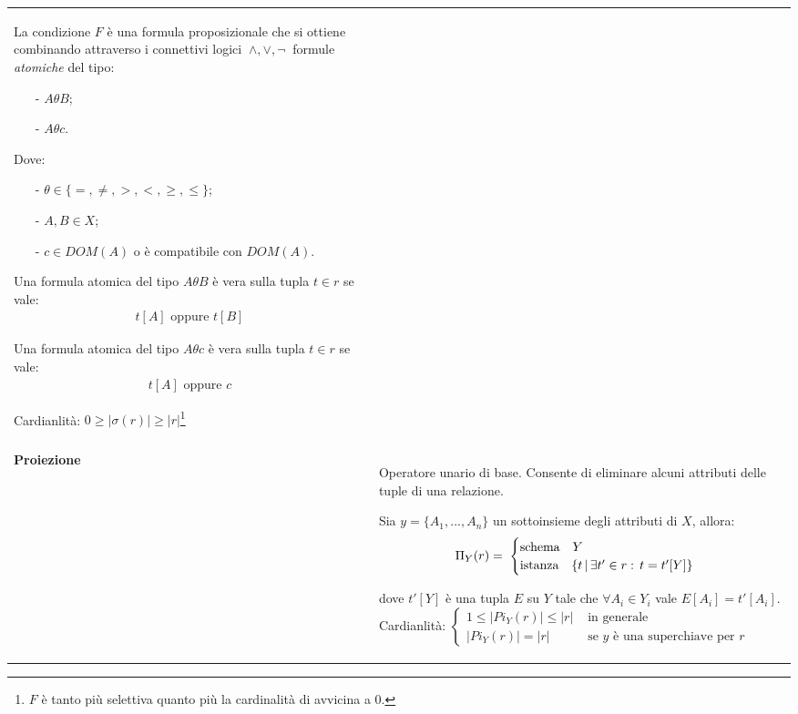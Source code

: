 \documentclass[a4paper, 10pt]{report}
\begin{document}
\begin{longtable}{| p{} | p{} |}
La condizione $F$ è una formula proposizionale che si ottiene combinando attraverso i connettivi logici $\: \wedge, \vee, \neg \:$ formule \emph{atomiche} del tipo:

			\begin{itemize}
				\item[-] $A \theta B$;
				\item[-] $A \theta c$.
			\end{itemize}		
			Dove:
			
			\begin{itemize}
				\item[-] $\theta \in \{ =, \neq, >, <,  \geq, \leq \}$;
				\item[-] $A, B \in X$;
				\item[-] $c \in DOM(A)$ o è compatibile con $DOM(A)$.
			\end{itemize}
			
Una formula atomica del tipo $A\theta B$ è vera sulla tupla $t \in r$ se vale:
\begin{align*}
t[A] \text{ oppure } t[B]
\end{align*}

Una formula atomica del tipo $A\theta c$ è vera sulla tupla $t \in r$ se vale:
\begin{align*}
t[A] \text{ oppure } c
\end{align*}

Cardianlità: $0 \ge |\sigma(r)| \ge |r|$\footnote{$F$ è tanto più selettiva quanto più la cardinalità di avvicina a 0.}
\\\\
\textbf{Proiezione} & Operatore unario di base. Consente di eliminare alcuni attributi delle tuple di una relazione.

Sia $y = \{ A_1, ..., A_n\}$ un sottoinsieme degli attributi di $X$, allora:
\begin{align*}
\Pi_Y (r) = \;
				\begin{cases}
					\textup{schema} \quad Y \\
					\textup{istanza} \quad \{ t \, | \, \exists t' \in r : \, t = t'[Y]  \}
				\end{cases}
\end{align*}

dove $t'[Y]$ è una tupla $E$ su $Y$ tale che 
			$\forall A_i \in Y_i$ vale $E[A_i] = t'[A_i]$.
\newline
\newline
Cardianlità: $\begin{cases} 
1 \le |Pi_Y (r)| \le |r|& \text{ in generale}\\ 
|Pi_Y (r)| = |r|& \text{ se $y$ è una superchiave per $r$}
\end{cases}$ 
\end{longtable}
\end{document}
